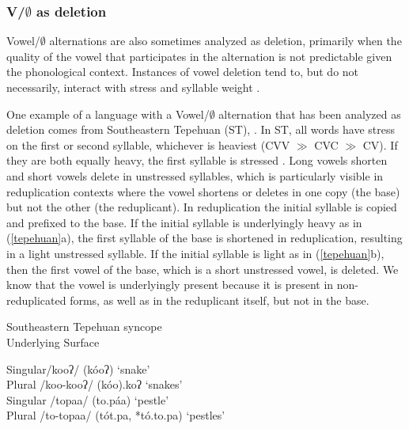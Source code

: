 \documentclass[output=paper,colorlinks,citecolor=brown]{langscibook}
\begin{document}
\subsubsection{V/$\emptyset$ as deletion}\label{sec:deletion}
Vowel/$\emptyset$ alternations are also sometimes analyzed as deletion, primarily when the quality of the vowel that participates in the alternation is not predictable given the phonological context. Instances of vowel deletion tend to, but do not necessarily, interact with stress and syllable weight \citep{Hawkins:1950, Anderson:1965, Al:1981, Willett:1982, Willett:1991, Fitzgerald:1997, Fitzgerald:2002, Kager:1997, Yu:2000stress,  Jacobs:2004, Riggle:2006, McCarthy:Syncope}. 

One example of a language with a Vowel/$\emptyset$ alternation that has been analyzed as deletion comes from Southeastern Tepehuan (ST), \citep{Willett:1982, Willett:1991, Kager:1997}. In ST, all words have stress on the first or second syllable, whichever is heaviest (CVV $\gg$ CVC $\gg$ CV). If they are both equally heavy, the first syllable is stressed \citep[176]{Willett:1982}. Long vowels shorten and short vowels delete in unstressed syllables, which is particularly visible in reduplication contexts where the vowel shortens or deletes in one copy (the base) but not the other (the reduplicant). In reduplication the initial syllable is copied and prefixed to the base. If the initial syllable is underlyingly heavy as in (\ref{tepehuan}a), the first syllable of the base is shortened in reduplication, resulting in a light unstressed syllable. If the initial syllable is light as in (\ref{tepehuan}b), then the first vowel of the base, which is a short unstressed vowel, is deleted. We know that the vowel is underlyingly present because it is present in non-reduplicated forms, as well as in the reduplicant itself, but not in the base.

\begin{exe}
    \ex Southeastern Tepehuan syncope\label{tepehuan}\\
    \tab \tab \hspace{4mm} Underlying \hspace{3mm} Surface
    \begin{xlist}
        \ex  Singular\tab /kooʔ/ \tab (kóoʔ) \tab \tab `snake' \\
			 Plural \tab  /koo-kooʔ/ \tab (kóo).koʔ \tab \tab `snakes'\\
		 \ex Singular \tab /topaa/ \tab (to.páa) \tab \tab `pestle'\\
			 Plural \tab /to-topaa/ \tab (tót.pa, *tó.to.pa) \tab `pestles'
    \end{xlist}
\end{exe}
\end{document}
